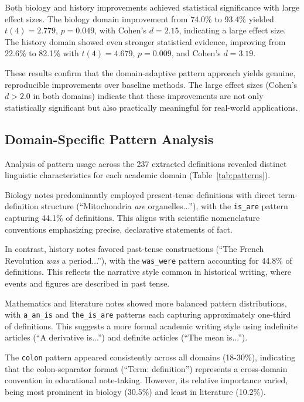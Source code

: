 

Both biology and history improvements achieved statistical significance with large effect sizes. The biology domain improvement from 74.0\% to 93.4\% yielded $t(4) = 2.779$, $p = 0.049$, with Cohen's $d = 2.15$, indicating a large effect size. The history domain showed even stronger statistical evidence, improving from 22.6\% to 82.1\% with $t(4) = 4.679$, $p = 0.009$, and Cohen's $d = 3.19$.

These results confirm that the domain-adaptive pattern approach yields genuine, reproducible improvements over baseline methods. The large effect sizes (Cohen's $d > 2.0$ in both domains) indicate that these improvements are not only statistically significant but also practically meaningful for real-world applications.

\subsection{Domain-Specific Pattern Analysis}

Analysis of pattern usage across the 237 extracted definitions revealed distinct linguistic characteristics for each academic domain (Table~\ref{tab:patterns}).



Biology notes predominantly employed present-tense definitions with direct term-definition structure (``Mitochondria \textit{are} organelles...''), with the \texttt{is\_are} pattern capturing 44.1\% of definitions. This aligns with scientific nomenclature conventions emphasizing precise, declarative statements of fact.

In contrast, history notes favored past-tense constructions (``The French Revolution \textit{was} a period...''), with the \texttt{was\_were} pattern accounting for 44.8\% of definitions. This reflects the narrative style common in historical writing, where events and figures are described in past tense.

Mathematics and literature notes showed more balanced pattern distributions, with \texttt{a\_an\_is} and \texttt{the\_is\_are} patterns each capturing approximately one-third of definitions. This suggests a more formal academic writing style using indefinite articles (``A derivative is...'') and definite articles (``The mean is...'').

The \texttt{colon} pattern appeared consistently across all domains (18-30\%), indicating that the colon-separator format (``Term: definition'') represents a cross-domain convention in educational note-taking. However, its relative importance varied, being most prominent in biology (30.5\%) and least in literature (10.2\%).


